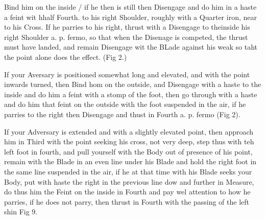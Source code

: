 \exercise{}
Bind him on the inside / if he then is still then Disengage and do him
in a haste a feint wit hhalf Fourth. to his right Shoulder, roughly
with a Quarter iron, near to his Cross. If he parries to his right,
thrust with a Disengage to theinside his right Shoulder a. p. fermo,
so that when the Disenage is competed, the thrust must have landed,
and remain Disengage wit the BLade against his weak so taht the point
alone does the effect. (Fig 2.)

If your Aversary is positioned somewhat long and elevated, and with
the point inwards turned, then Bind hom on the outside, and Disengage
with a haste to the inside and do him a feint with a stomp of the
foot, then go through with a haste and do him that feint on the
outside with the foot suspended in the air, if he parries to the right
then Disengage and thust in Fourth a. p. fermo (Fig 2).

\exercise{}
If your Adversary is extended and with a slightly elevated point, then
approach him in Third with the point seeking his cross, not very deep,
step thus with teh left foot in fourth, and pull yourself with the Body
out of presence of his point, remain with the Blade in an even line
under his Blade and hold the right foot in the same line suspended in
the air, if he at that time with his Blade seeks your Body, put with
haste the right in the previous line dow and further in Measure, do
thus him the Feint on the inside in Fourth and pay wel attention to
how he parries, if he does not parry, then thrust in Fourth with the
passing of the left shin Fig 9.

